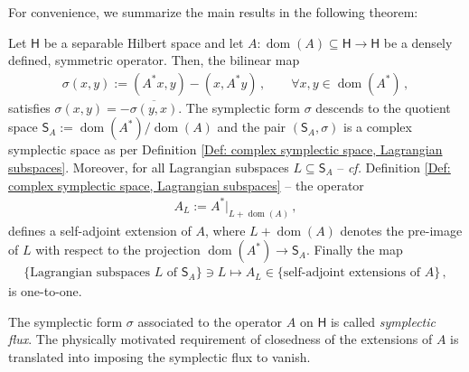 \noindent For convenience, we summarize the main results in the following theorem:
\begin{theorem}\label{Thm: self-adjoint extensions with Lagrangian subspaces}
	Let $\mathsf{H}$ be a separable Hilbert space and let $A\colon\operatorname{dom}(A)\subseteq\mathsf{H}\to\mathsf{H}$ be a densely defined, symmetric operator.
	Then, the bilinear map
	\begin{align}\label{Eqn: symplectic form}
		\sigma(x,y):=(A^*x,y)-(x,A^*y)\,,\qquad\forall x,y\in\operatorname{dom}(A^*)\,,
	\end{align}
	satisfies $\sigma(x,y)=-\overline{\sigma(y,x)}$.
	The symplectic form $\sigma$ descends to the quotient space $\mathsf{S}_A:=\operatorname{dom}(A^*)/\operatorname{dom}(A)$ and the pair $(\mathsf{S}_A,\sigma)$ is a complex symplectic space as per Definition \ref{Def: complex symplectic space, Lagrangian subspaces}.
	Moreover, for all Lagrangian subspaces $L\subseteq\mathsf{S}_A$  -- \textit{cf.} Definition \ref{Def: complex symplectic space, Lagrangian subspaces} -- the operator
	\begin{align}\label{Eqn: Lagrangian self-adjoint extension}
		A_L:=A^*|_{L+\operatorname{dom}(A)}\,,
	\end{align}
	defines a self-adjoint extension of $A$, where $L+\operatorname{dom}(A)$ denotes the pre-image of $L$ with respect to the projection $\operatorname{dom}(A^*)\to\mathsf{S}_A$.
	Finally the map
	\begin{align}
		\lbrace\textrm{Lagrangian subspaces $L$ of $\mathsf{S}_A$}\rbrace
		\ni L\mapsto A_L\in
		\lbrace\textrm{self-adjoint extensions of }A\rbrace\,,
	\end{align}
	is one-to-one.
\end{theorem}

\begin{remark}
	The symplectic form $\sigma$ associated to the operator $A$ on $\mathsf{H}$ is called \emph{symplectic flux}. The physically motivated requirement of closedness of the extensions of $A$ is translated into imposing the symplectic flux to vanish.
\end{remark}

